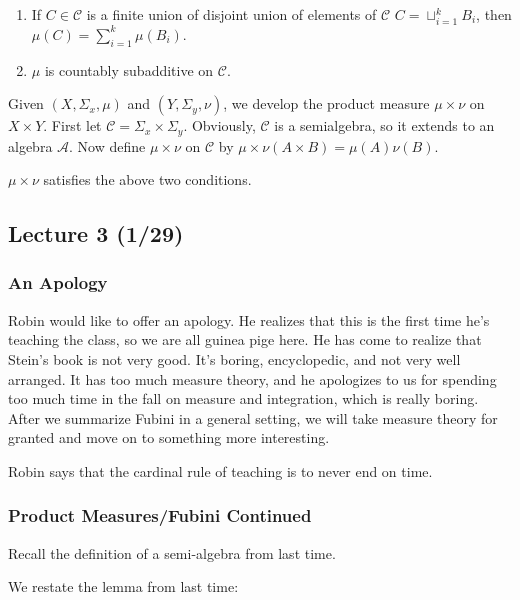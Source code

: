 \documentclass[10pt, twoside]{article}
\begin{document}
    \begin{enumerate} \item If $C \in \mathcal{C}$ is a finite union of
    disjoint union of elements of $\mathcal{C}$ $C = \sqcup_{i=1}^k B_i$, then
    $\mu(C) = \sum_{i=1}^k \mu(B_i)$.  \item $\mu$ is countably subadditive on
    $\mathcal{C}$.  \end{enumerate}

    Given $(X, \Sigma_x, \mu)$ and $(Y,\Sigma_y,\nu)$, we develop the product
    measure $\mu \times \nu$ on $X \times Y$. First let $\mathcal{C} = \Sigma_x
    \times \Sigma_y$. Obviously, $\mathcal{C}$ is a semialgebra, so it extends
    to an algebra $\mathcal{A}$. Now define $\mu \times \nu$ on $\mathcal{C}$
    by $\mu \times \nu (A \times B) = \mu(A)\nu(B)$.

    \begin{lem} $\mu \times \nu$ satisfies the above two conditions.  \end{lem}

    \subsection{Lecture 3 (1/29)}

    \subsubsection{An Apology} Robin would like to offer an apology. He
    realizes that this is the first time he's teaching the class, so we are all
    guinea pige here. He has come to realize that Stein's book is not very
    good. It's boring, encyclopedic, and not very well arranged. It has too
    much measure theory, and he apologizes to us for spending too much time in
    the fall on measure and integration, which is really boring. After we
    summarize Fubini in a general setting, we will take measure theory for
    granted and move on to something more interesting.

    Robin says that the cardinal rule of teaching is to never end on time.

    \subsubsection{Product Measures/Fubini Continued} Recall the definition of
    a semi-algebra from last time.

    We restate the lemma from last time: 
\end{document}

